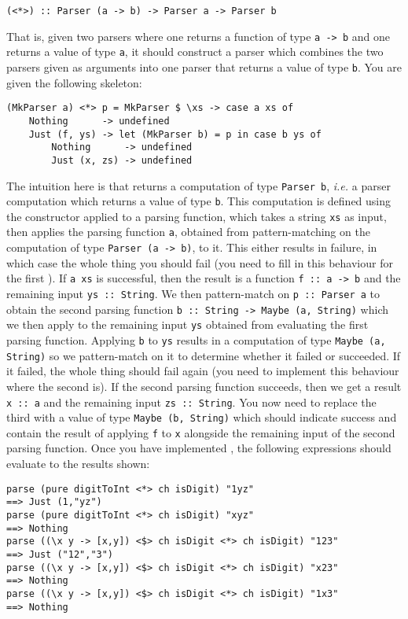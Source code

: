 \begin{verbatim}
(<*>) :: Parser (a -> b) -> Parser a -> Parser b
\end{verbatim}
That is, given two parsers where one returns a function of type \texttt{\small a -> b} and one returns a value of type \texttt{\small a}, it should construct a parser which combines the two parsers given as arguments into one parser that returns a value of type \texttt{\small b}. You are given the following skeleton:
\begin{verbatim}
(MkParser a) <*> p = MkParser $ \xs -> case a xs of
    Nothing      -> undefined
    Just (f, ys) -> let (MkParser b) = p in case b ys of
        Nothing      -> undefined
        Just (x, zs) -> undefined
\end{verbatim}
The intuition here is that \haskellIn{(<*>)} returns a computation of type \texttt{\small Parser b}, \emph{i.e.} a parser computation which returns a value of type \texttt{\small b}. This computation is defined using the  constructor applied to a parsing function, which takes a string \texttt{\small xs} as input, then applies the parsing function \texttt{\small a}, obtained from pattern-matching on the computation of type \texttt{\small Parser (a -> b)}, to it. This either results in failure, in which case the whole thing you should fail (you need to fill in this behaviour for the first ). If \texttt{\small a xs} is successful, then the result is a function \texttt{\small f~::~a -> b} and the remaining input \texttt{\small ys~::~String}. We then pattern-match on \texttt{\small p~::~Parser a} to obtain the second parsing function \texttt{\small b~::~String -> Maybe (a, String)} which we then apply to the remaining input \texttt{\small ys} obtained from evaluating the first parsing function. Applying \texttt{\small b} to \texttt{\small ys} results in a computation of type \texttt{\small Maybe (a, String)} so we pattern-match on it to determine whether it failed or succeeded. If it failed, the whole thing should fail again (you need to implement this behaviour where the second  is). If the second parsing function succeeds, then we get a result \texttt{\small x~::~a} and the remaining input \texttt{\small zs~::~String}. You now need to replace the third  with a value of type \texttt{\small Maybe (b, String)} which should indicate success and contain the result of applying \texttt{\small f} to \texttt{\small x} alongside the remaining input of the second parsing function. Once you have implemented \haskellIn{(<*>)}, the following expressions should evaluate to the results shown:
\begin{verbatim}
parse (pure digitToInt <*> ch isDigit) "1yz" 
==> Just (1,"yz")
parse (pure digitToInt <*> ch isDigit) "xyz" 
==> Nothing 
parse ((\x y -> [x,y]) <$> ch isDigit <*> ch isDigit) "123" 
==> Just ("12","3")
parse ((\x y -> [x,y]) <$> ch isDigit <*> ch isDigit) "x23" 
==> Nothing
parse ((\x y -> [x,y]) <$> ch isDigit <*> ch isDigit) "1x3" 
==> Nothing
\end{verbatim}


